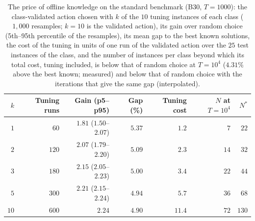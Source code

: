 \begin{table}[t]
\caption{The price of offline knowledge on the standard benchmark (B30, $T=1000$): the class-validated action chosen with $k$ of the $10$ tuning instances of each class ($1{,}000$ resamples; $k=10$ is the validated action), its gain over random choice (5th--95th percentile of the resamples), its mean gap to the best known solutions, the cost of the tuning in units of one run of the validated action over the $25$ test instances of the class, and the number of instances per class beyond which its total cost, tuning included, is below that of random choice at $T=10^4$ ($4.31\%$ above the best known; measured) and below that of random choice with the iterations that give the same gap (interpolated).}
\label{tab:cost}
\centering
{\scriptsize\setlength{\tabcolsep}{4pt}
\begin{tabular}{@{}rrrrrrr@{}}
\toprule
$k$ & Tuning runs & Gain (p5--p95) & Gap (\%) & Tuning cost & $N$ at $T=10^4$ & $N^*$ \\
\midrule
$1$ & $60$ & $1.81$ ($1.50$--$2.07$) & $5.37$ & $1.2$ & $7$ & $22$ \\
$2$ & $120$ & $2.07$ ($1.79$--$2.20$) & $5.09$ & $2.3$ & $14$ & $32$ \\
$3$ & $180$ & $2.15$ ($2.05$--$2.23$) & $5.00$ & $3.4$ & $22$ & $44$ \\
$5$ & $300$ & $2.21$ ($2.15$--$2.24$) & $4.94$ & $5.7$ & $36$ & $68$ \\
$10$ & $600$ & $2.24$ & $4.90$ & $11.4$ & $72$ & $130$ \\
\bottomrule
\end{tabular}}
\end{table}
